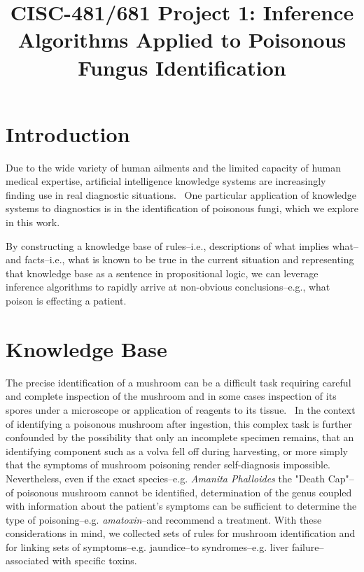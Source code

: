 \documentclass[12pt, conference, compsocconf]{IEEEtran}
\begin{document}
\title{CISC-481/681 Project 1: Inference Algorithms Applied to Poisonous Fungus Identification}

\author{ }

\maketitle

\section{Introduction}
Due to the wide variety of human ailments and the limited capacity of human medical expertise, artificial intelligence knowledge systems are increasingly finding use in real diagnostic situations.~\cite{expert-systems-in-diagnosis}
One particular application of knowledge systems to diagnostics is in the identification of poisonous fungi, which we explore in this work. 

By constructing a knowledge base of rules--i.e., descriptions of what implies what--and facts--i.e., what is known to be true in the current situation and representing that knowledge base as a sentence in propositional logic, we can leverage inference algorithms to rapidly arrive at non-obvious conclusions--e.g., what poison is effecting a patient. 



\section{Knowledge Base}
The precise identification of a mushroom can be a difficult task requiring careful and complete inspection of the mushroom and in some cases inspection of its spores under a microscope or application of reagents to its tissue.~\cite{handbook-mushroom-poison}
In the context of identifying a poisonous mushroom after ingestion, this complex task is further confounded by the possibility that only an incomplete specimen remains, that an identifying component such as a volva fell off during harvesting, or more simply that the symptoms of mushroom poisoning render self-diagnosis impossible. 
Nevertheless, even if the exact species--e.g. \emph{Amanita Phalloides} the "Death Cap"--of poisonous mushroom cannot be identified, determination of the genus coupled with information about the patient's symptoms can be sufficient to determine the type of poisoning--e.g. \emph{amatoxin}--and recommend a treatment. 
With these considerations in mind, we collected sets of rules for mushroom identification and for linking sets of symptoms--e.g. jaundice--to syndromes--e.g. liver failure--associated with specific toxins. 
\end{document}
